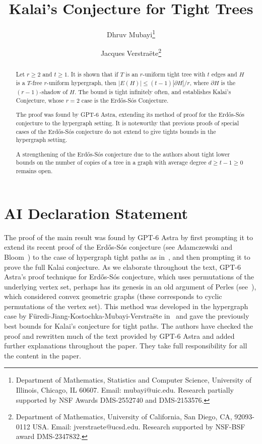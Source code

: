 \documentclass[11pt]{article}
\title{Kalai's Conjecture for Tight Trees}
\author{
	Dhruv Mubayi\thanks{Department of Mathematics, Statistics and Computer Science, University of Illinois, Chicago, IL 60607. Email: mubayi@uic.edu. Research partially supported by NSF Awards DMS-2552740 and DMS-2153576.} \and
	Jacques Verstra\" ete\thanks{Department of Mathematics, University of California, San Diego, CA, 92093-0112 USA.
		Email: jverstraete@ucsd.edu.
		Research supported by NSF-BSF award DMS-2347832.  }}
\date{}
\theoremstyle{remark}
\numberwithin{equation}{section}
\newcommand{\sh}{\partial}
\begin{document}
	\maketitle
	
	\begin{abstract}
		Let $r \ge 2$ and $t \ge 1$. It is shown that if $T$ is an $r$-uniform tight tree with $t$ edges and
		$H$ is a $T$-free $r$-uniform hypergraph, then
		$|E(H)|\le (t-1)|\sh H|/r$, where $\sh H$ is the $(r-1)$-shadow
		of $H$. The bound is tight infinitely often, and establishes Kalai's Conjecture, whose $r=2$ case is the Erd\H os-S\'os Conjecture.
		
		The proof was
		found by GPT-6 Astra, extending its method of proof for the Erd\H os-S\'os conjecture to the hypergraph setting. It is noteworthy that previous proofs of special cases of the Erd\H os-S\'os conjecture do not extend to give tights bounds in the hypergraph setting. 
		
		A strengthening of the Erd\H os-S\'os conjecture due to the authors about tight lower bounds on the number  of copies of a tree in a graph with  average degree $d \ge t-1\ge 0$ remains open. 
	\end{abstract}
	
	\section{AI Declaration Statement}
	The proof of the main result was found by GPT-6 Astra by first  prompting it to extend its recent proof of the Erd\H os-S\'os conjecture (see Adamczewski and Bloom~\cite[Appendix B.4]{Epoch})  to the case of hypergraph tight paths as in~\cite{FJKMVpaths}, and then prompting it to prove the full Kalai conjecture. As we elaborate throughout the text, GPT-6 Astra's  proof technique for Erd\H os-S\'os conjecture, which uses permutations of the underlying vertex set, perhaps has its genesis in an old argument of Perles (see~\cite{KupitzPerles}), which considered convex geometric graphs (these corresponds to cyclic permutations of the vertex set).  This method was developed in the hypergraph case by F\"uredi-Jiang-Kostochka-Mubayi-Verstra\"ete in~\cite{FJKMVpaths} and gave the previously best bounds for Kalai's conjecture for tight paths. The authors have checked the proof and rewritten much of the text provided by GPT-6 Astra and added further explanations throughout the paper. They take full responsibility for all the content in the paper.
	
\end{document}
